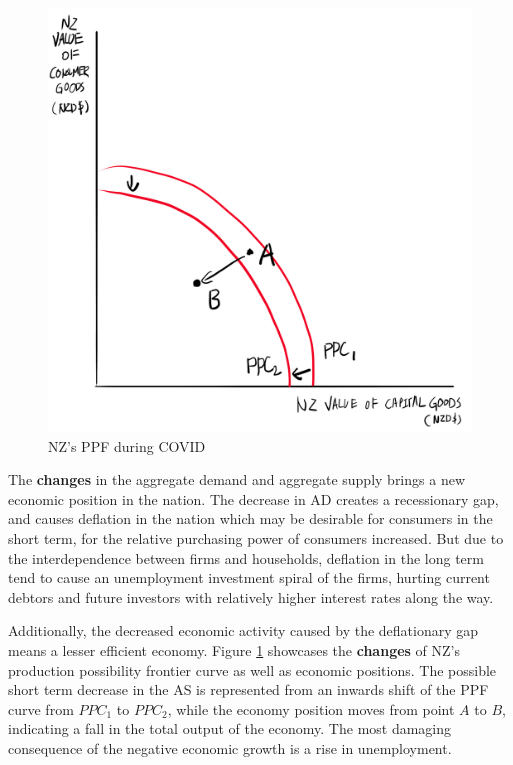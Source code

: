 \documentclass[a4paper,12pt]{article}
\begin{document}
\begin{figure}[H]
    \centering
    \includegraphics[scale=0.6]{assets/ppf.png}
    \caption{NZ's PPF during COVID}
    \label{fig:ppf}
\end{figure}

The \textbf{changes} in the aggregate demand and aggregate supply brings a new economic position in the nation. The decrease in AD creates a recessionary gap, and causes deflation in the nation which may be desirable for consumers in the short term, for the relative purchasing power of consumers increased. But due to the interdependence between firms and households, deflation in the long term tend to cause an unemployment investment spiral of the firms, hurting current debtors and future investors with relatively higher interest rates along the way.

Additionally, the decreased economic activity caused by the deflationary gap means a lesser efficient economy. Figure \ref{fig:ppf} showcases the \textbf{changes} of NZ's production possibility frontier curve as well as economic positions. The possible short term decrease in the AS is represented from an inwards shift of the PPF curve from $PPC_1$ to $PPC_2$, while the economy position moves from point $A$ to $B$, indicating a fall in the total output of the economy. The most damaging consequence of the negative economic growth is a rise in unemployment.
\end{document}
